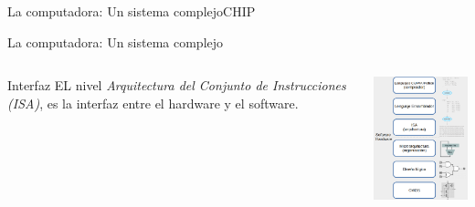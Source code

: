\documentclass[aspectratio=169,compress]{beamer}
\begin{document}
\begin{frame}{La computadora: Un sistema complejo}{CHIP}
\begin{frame}{La computadora: Un sistema complejo}
\begin{columns}[onlytextwidth,T]
\begin{itemize}
\begin{small}
\bigskip

\item [Interfaz] EL nivel \textit{Arquitectura del Conjunto de 
Instrucciones (ISA)}, es la interfaz entre el hardware y el software.

	\end{small}
	\end{itemize}

      \column{60mm}
    \includegraphics[width=50mm]{images/abstracciones2.png}

    \end{columns}

\end{frame}












\end{frame}
\end{document}

